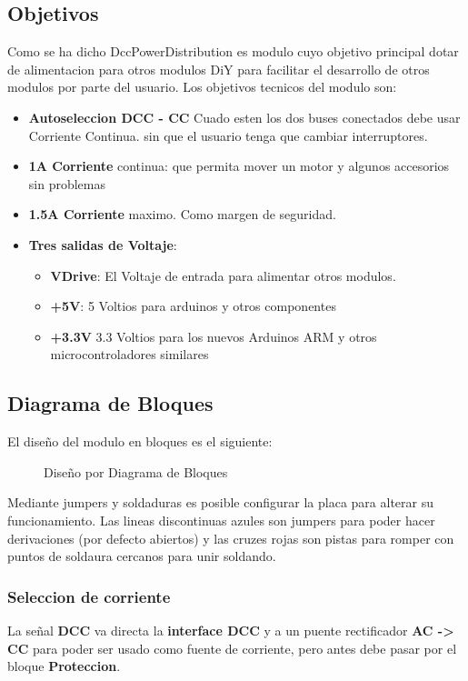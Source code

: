 \subsection{Objetivos}
Como se ha dicho DccPowerDistribution es modulo cuyo objetivo principal dotar de alimentacion para otros modulos DiY
para facilitar el desarrollo de otros modulos por parte del usuario. Los objetivos tecnicos del modulo son:
\begin{itemize}
    \item \textbf{Autoseleccion DCC - CC} Cuado esten los dos buses conectados debe usar Corriente Continua.
sin que el usuario tenga que cambiar interruptores.    
    \item \textbf{1A Corriente} continua: que permita mover un motor y algunos accesorios
sin problemas
    \item \textbf{1.5A Corriente} maximo. Como margen de seguridad.
    \item \textbf{Tres salidas de Voltaje}:
    \begin{itemize}
        \item \textbf{VDrive}: El Voltaje de entrada para alimentar otros modulos.
        \item \textbf{+5V}: 5 Voltios para arduinos y otros componentes
        \item \textbf{+3.3V} 3.3 Voltios para los nuevos Arduinos ARM y otros microcontroladores similares
    \end{itemize} 
\end{itemize}

\subsection{Diagrama de Bloques}
El diseño del modulo en bloques es el siguiente:
\begin{figure}[H]
    \centering
    
    \caption{Diseño por Diagrama de Bloques}
    \label{fig:BlockDiagrama}
\end{figure}
Mediante jumpers y soldaduras es posible configurar la placa para alterar su funcionamiento.
Las lineas discontinuas azules son jumpers para poder hacer derivaciones (por defecto abiertos) y
las cruzes rojas son pistas para romper con puntos de soldaura cercanos para unir soldando.

\subsubsection{Seleccion de corriente}
La señal \textbf{DCC} va directa la \textbf{interface DCC} y a un puente rectificador
\textbf{AC -> CC} para poder ser usado como fuente de corriente, pero antes debe pasar
por el bloque \textbf{Proteccion}. 

